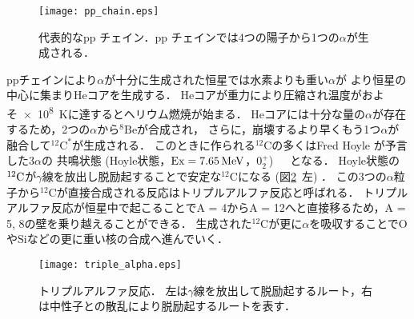 \documentclass[../master]{subfiles}
\begin{document}
\begin{figure}
  \centering
  \texttt{[image: pp\_chain.eps]}
  \caption{代表的なpp チェイン．pp チェインでは4つの陽子から1つの$\alpha$が生成される．}
  \label{fig::pp_chain}
\end{figure}

ppチェインにより$\alpha$が十分に生成された恒星では水素よりも重い$\alpha$が
より恒星の中心に集まり$\mathrm{He}$コアを生成する．
$\mathrm{He}$コアが重力により圧縮され温度がおよそ\SI{e8}{\kelvin}に達するとヘリウム燃焼が始まる．
$\mathrm{He}$コアには十分な量の$\alpha$が存在するため，2つの$\alpha$から${}^{8}\mathrm{Be}$が合成され，
さらに，崩壊するより早くもう1つ$\alpha$が融合して${}^{12}\mathrm{C}^{*}$が生成される．
このときに作られる${}^{12}\mathrm{C}$の多くはFred Hoyle が予言した$3\alpha$の
共鳴状態 (Hoyle状態，${\rm Ex} = \SI{7.65}{\mega\electronvolt}$，$0_{2}^{+}$)~\cite{hoyle_state}　となる．
Hoyle状態の${}^{12}{\rm C}$が$\gamma$線を放出し脱励起することで安定な${}^{12}\mathrm{C}$になる
 (図\ref{fig::triple_alpha}~左) ．
この3つの$\alpha$粒子から${}^{12}\mathrm{C}$が直接合成される反応はトリプルアルファ反応と呼ばれる．
トリプルアルファ反応が恒星中で起こることでA = 4からA = 12へと直接移るため，A = 5, 8の壁を乗り越えることができる．
生成された${}^{12}\mathrm{C}$が更に$\alpha$を吸収することで$\mathrm{O}$や$\mathrm{Si}$などの更に重い核の合成へ進んでいく．
\begin{figure}
  \centering
  \texttt{[image: triple\_alpha.eps]}
  \caption[トリプルアルファ反応．]{トリプルアルファ反応．
    左は$\gamma$線を放出して脱励起するルート，右は中性子との散乱により脱励起するルートを表す．}
  \label{fig::triple_alpha}
\end{figure}
\end{document}
